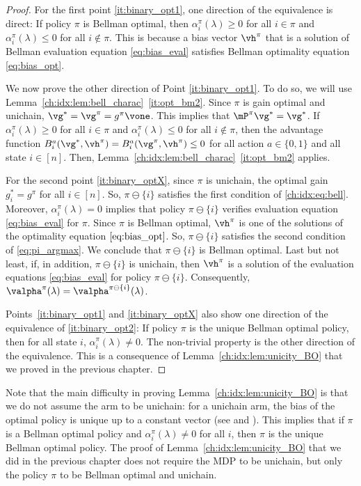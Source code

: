 \begin{proof}
    For the first point \ref{it:binary_opt1}, one direction of the equivalence is direct: If policy $\pi$ is Bellman optimal, then $\alpha^\pi_i(\lambda)\ge0$ for all $i\in\pi$ and $\alpha^\pi_i(\lambda)\le0$ for all $i\notin\pi$.
    This is because a bias vector $\vh^\pi$ that is a solution of Bellman evaluation equation \eqref{eq:bias_eval} satisfies Bellman optimality equation \eqref{eq:bias_opt}.

    We now prove the other direction of Point \ref{it:binary_opt1}.
    To do so, we will use Lemma~\ref{ch:idx:lem:bell_charac}~\ref{it:opt_bm2}.
    Since $\pi$ is gain optimal and unichain, $\vg^*=\vg^\pi=g^{\pi}\vone$.
    This implies that $\mP^\pi\vg^*=\vg^*$.
    If $\alpha^\pi_i(\lambda)\ge0$ for all $i\in\pi$ and $\alpha^\pi_i(\lambda)\le0$ for all $i\notin\pi$, then the advantage function $B^a_i(\vg^*, \vh^\pi)=B^a_i(\vg^\pi, \vh^\pi)\le 0$ for all action $a\in\{0,1\}$ and all state $i\in[n]$.
    Then, Lemma~\ref{ch:idx:lem:bell_charac}~\ref{it:opt_bm2} applies.

    For the second point \ref{it:binary_optX}, since $\pi$ is unichain, the optimal gain $g^*_i=g^\pi$ for all $i\in[n]$.
    So, $\pi\ominus\{i\}$ satisfies the first condition of \eqref{ch:idx:eq:bell}.
    Moreover, $\alpha^\pi_i(\lambda)=0$ implies that policy $\pi\ominus\{i\}$ verifies  evaluation equation \eqref{eq:bias_eval} for $\pi$.
    Since $\pi$ is Bellman optimal, $\vh^\pi$ is one of the solutions of the optimality equation $\eqref{eq:bias_opt}$.
    So, $\pi\ominus\{i\}$ satisfies the second condition of \eqref{eq:pi_argmax}.
    We conclude that $\pi\ominus\{i\}$ is Bellman optimal.
    Last but not least, if, in addition, $\pi\ominus\{i\}$ is unichain, then $\vh^\pi$ is a solution of the evaluation equations \eqref{eq:bias_eval} for policy $\pi\ominus\{i\}$. Consequently, $\valpha^\pi(\lambda)=\valpha^{\pi\ominus\{i\}}(\lambda)$.
    
    Points~\ref{it:binary_opt1} and \ref{it:binary_optX} also show one direction of the equivalence of \ref{it:binary_opt2}: If policy $\pi$ is the unique Bellman optimal policy, then for all state $i$, $\alpha^\pi_i(\lambda)\ne0$. The non-trivial property is the other direction of the equivalence. This is a consequence of Lemma~\ref{ch:idx:lem:unicity_BO} that we proved in the previous chapter.
\end{proof}

Note that the main difficulty in proving Lemma~\ref{ch:idx:lem:unicity_BO} is that we do not assume the arm to be unichain: for a unichain arm, the bias of the optimal policy is unique up to a constant vector (see \cite{schweitzer1978functional} and \cite[Section 8.4]{puterman2014markov}).
This implies that if $\pi$ is a Bellman optimal policy and $\alpha^\pi_i(\lambda)\ne0$ for all $i$, then $\pi$ is the unique Bellman optimal policy.
The proof of Lemma~\ref{ch:idx:lem:unicity_BO} that we did in the previous chapter does not require the MDP to be unichain, but only the policy $\pi$ to be Bellman optimal and unichain.

